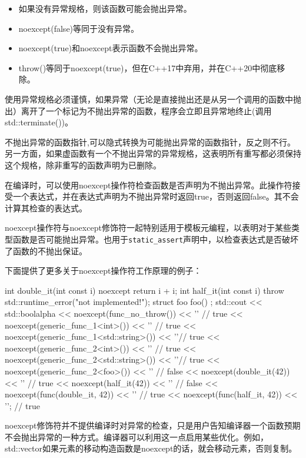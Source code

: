 \begin{itemize}
\item
如果没有异常规格，则该函数可能会抛出异常。

\item
noexcept(false)等同于没有异常。

\item
noexcept(true)和noexcept表示函数不会抛出异常。

\item
throw()等同于noexcept(true)，但在C++17中弃用，并在C++20中彻底移除。
\end{itemize}

\begin{myNotic}
使用异常规格必须谨慎，如果异常（无论是直接抛出还是从另一个调用的函数中抛出）离开了一个标记为不抛出异常的函数，程序会立即且异常地终止(调用std::terminate())。
\end{myNotic}

不抛出异常的函数指针,可以隐式转换为可能抛出异常的函数指针，反之则不行。另一方面，如果虚函数有一个不抛出异常的异常规格，这表明所有重写都必须保持这个规格，除非重写的函数声明为已删除。

在编译时，可以使用noexcept操作符检查函数是否声明为不抛出异常。此操作符接受一个表达式，并在表达式声明为不抛出异常时返回true，否则返回false。其不会计算其检查的表达式。

noexcept操作符与noexcept修饰符一起特别适用于模板元编程，以表明对于某些类型函数是否可能抛出异常。也用于\verb|static_assert|声明中，以检查表达式是否破坏了函数的不抛出保证。

下面提供了更多关于noexcept操作符工作原理的例子：

\begin{cpp}
int double_it(int const i) noexcept
{
    return i + i;
}
int half_it(int const i)
{
    throw std::runtime_error("not implemented!");
}
struct foo
{
    foo() {}
};
std::cout << std::boolalpha
    << noexcept(func_no_throw()) <<  '\n' // true
    << noexcept(generic_func_1<int>()) <<  '\n' // true
    << noexcept(generic_func_1<std::string>()) <<  '\n'// true
    << noexcept(generic_func_2<int>()) << '\n' // true
    << noexcept(generic_func_2<std::string>()) <<  '\n'// true
    << noexcept(generic_func_2<foo>()) <<  '\n' // false
    << noexcept(double_it(42)) <<  '\n' // true
    << noexcept(half_it(42)) <<  '\n' // false
    << noexcept(func(double_it, 42)) <<  '\n' // true
    << noexcept(func(half_it, 42)) << '\n';            // true
\end{cpp}

noexcept修饰符并不提供编译时对异常的检查，只是用户告知编译器一个函数预期不会抛出异常的一种方式。编译器可以利用这一点启用某些优化。例如，std::vector如果元素的移动构造函数是noexcept的话，就会移动元素，否则复制。

